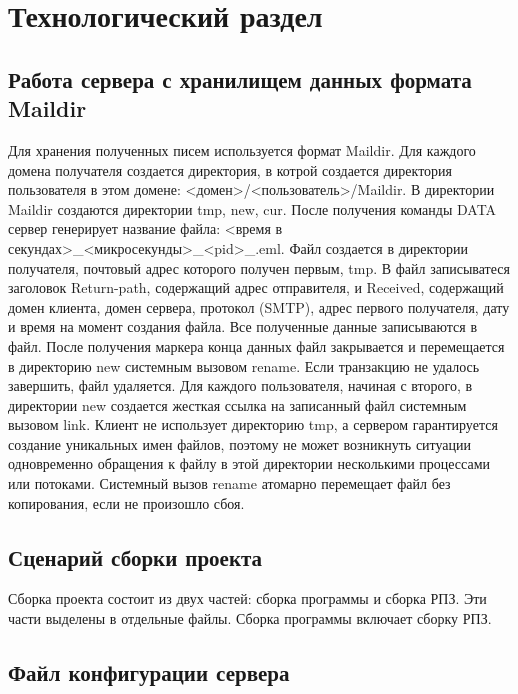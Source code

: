 \chapter{Технологический раздел}
\label{cha:implementation}

\section{Работа сервера с хранилищем данных формата Maildir}

Для хранения полученных писем используется формат Maildir.
Для каждого домена получателя создается директория, в котрой создается директория пользователя в этом домене: <домен>/<пользователь>/Maildir.
В директории Maildir создаются директории tmp, new, cur.
После получения команды DATA сервер генерирует название файла: <время в секундах>\_<микросекунды>\_<pid>\_<случайное число>.eml.
Файл создается в директории получателя, почтовый адрес которого получен первым, tmp.
В файл записыватеся заголовок Return-path, содержащий адрес отправителя, и Received, содержащий домен клиента, домен сервера, протокол (SMTP), адрес первого получателя, дату и время на момент создания файла.
Все полученные данные записываются в файл.
После получения маркера конца данных файл закрывается и перемещается в директорию new системным вызовом rename.
Если транзакцию не удалось завершить, файл удаляется.
Для каждого пользователя, начиная с второго, в директории new создается жесткая ссылка на записанный файл системным вызовом link.
Клиент не использует директорию tmp, а сервером гарантируется создание уникальных имен файлов, поэтому не может возникнуть ситуации одновременно обращения к файлу в этой директории несколькими процессами или потоками.
Системный вызов rename атомарно перемещает файл без копирования, если не произошло сбоя.

\section{Сценарий сборки проекта}

Сборка проекта состоит из двух частей: сборка программы и сборка РПЗ.
Эти части выделены в отдельные файлы.
Сборка программы включает сборку РПЗ.




\section{Файл конфигурации сервера}

